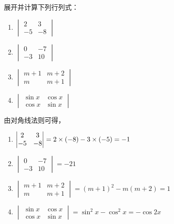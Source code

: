 \begin{example}
    展开并计算下列行列式：
\begin{multicols}{2}
\begin{enumerate}
    \item $\begin{vmatrix}
        2&3\\-5&-8
    \end{vmatrix}$
    \item $\begin{vmatrix}
        0&-7\\-3&10
    \end{vmatrix}$
    \item $\begin{vmatrix}
        m+1&m+2\\m&m+1
    \end{vmatrix}$
    \item $\begin{vmatrix}
        \sin x& \cos x\\ \cos x&\sin x
    \end{vmatrix}$
\end{enumerate}
\end{multicols}
\end{example}

\begin{solution}
由对角线法则可得，  
\begin{enumerate}
    \item $\begin{vmatrix}
        2&3\\-5&-8
    \end{vmatrix}=2\times(-8)-3\times (-5)=-1$
    \item $\begin{vmatrix}
        0&-7\\-3&10
    \end{vmatrix}=-21$
    \item $\begin{vmatrix}
        m+1&m+2\\m&m+1
    \end{vmatrix}=(m+1)^2-m(m+2)=1$
    \item $\begin{vmatrix}
        \sin x& \cos x\\ \cos x&\sin x
    \end{vmatrix}=\sin^2x-\cos^2x=-\cos2x$
\end{enumerate}
\end{solution}
  
